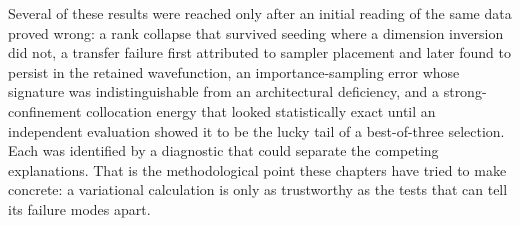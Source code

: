 Several of these results were reached only after an initial reading of the same data proved
wrong: a rank collapse that survived seeding where a dimension inversion did not, a transfer
failure first attributed to sampler placement and later found to persist in the retained
wavefunction, an importance-sampling
error whose signature was indistinguishable from an architectural deficiency, and a
strong-confinement collocation energy that looked statistically exact until an independent
evaluation showed it to be the lucky tail of a best-of-three selection. Each was
identified by a diagnostic that could separate the competing explanations. That is the
methodological point these chapters have tried to make concrete: a variational calculation is
only as trustworthy as the tests that can tell its failure modes apart.
